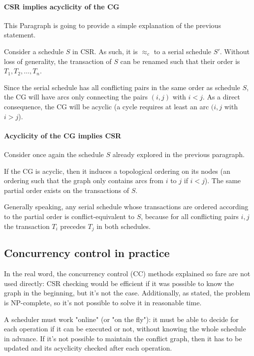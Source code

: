\documentclass[english]{article}
\begin{document}
\paragraph{CSR implies acyclicity of the CG}

This Paragraph is going to provide a simple explanation of the previous statement.

Consider a schedule \(S\) in CSR.
As such, it is \(\approx_c\) to a serial schedule \(S'\).
Without loss of generality, the transaction of \(S\) can be renamed such that their order is \(T_1, T_2, \dots, T_n\).

Since the serial schedule has all conflicting pairs in the same order as schedule \(S\), the CG will have arcs only connecting the pairs \((i, j)\) with \(i < j\).
As a direct consequence, the CG will be acyclic (a cycle requires at least an arc \((i, j\) with \(i > j\)).

\paragraph{Acyclicity of the CG implies CSR}

Consider once again the schedule \(S\) already explored in the previous paragraph.

If the CG is acyclic, then it induces a topological ordering on its nodes (an ordering such that the graph only contains arcs from \(i\) to \(j\) if \(i < j\)).
The same partial order exists on the transactions of \(S\).

Generally speaking, any serial schedule whose transactions are ordered according to the partial order is conflict-equivalent to \(S\), because for all conflicting pairs \(i, j\) the transaction \(T_i\) precedes \(T_j\) in both schedules.

\subsection{Concurrency control in practice}

In the real word, the concurrency control (CC) methods explained so fare are not used directly: CSR checking would be efficient if it was possible to know the graph in the beginning, but it's not the case.
Additionally, as stated, the problem is NP-complete, so it's not possible to solve it in reasonable time.

A scheduler must work "online" (or "on the fly"): it must be able to decide for each operation if it can be executed or not, without knowing the whole schedule in advance.
If it's not possible to maintain the conflict graph, then it has to be updated and its acyclicity checked after each operation.
\end{document}
